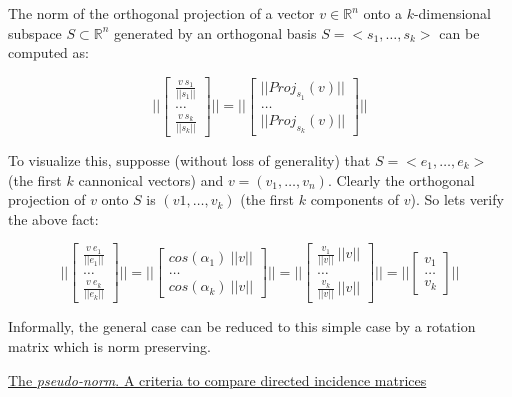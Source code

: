 \documentclass[a4paper,11pt]{article}
\begin{document}
\bigskip

The norm of the orthogonal projection of a vector $v \in \mathbb{R}^n$ 
onto a $k$-dimensional subspace $S \subset \mathbb{R}^n$ generated by an 
orthogonal basis $S = <s_1, \dots, s_k>$ can be computed as:

$$
||\begin{bmatrix}
	\frac{v \ s_1}{||s_1||} \\
	\dots \\
	\frac{v \ s_k}{||s_k||}
\end{bmatrix}|| = 
||\begin{bmatrix}
	||Proj_{s_1}(v)|| \\
	\dots \\
	||Proj_{s_k}(v)||
\end{bmatrix}||
$$

\bigskip

To visualize this, supposse (without loss of generality) that $S = 
<e_1, \dots, e_k>$ (the first $k$ cannonical vectors) and $v = (v_1, 
\dots, v_n)$. Clearly the orthogonal projection of $v$ onto $S$ 
is $(v1, \dots, v_k)$ (the first $k$ components of $v$). So lets verify 
the above fact:

$$
||\begin{bmatrix}
	\frac{v \ e_1}{||e_1||} \\
	\dots \\
	\frac{v \ e_k}{||e_k||}
\end{bmatrix}|| = 
||\begin{bmatrix}
	cos(\alpha_1) \ ||v|| \\
	\dots \\
	cos(\alpha_k) \ ||v||
\end{bmatrix}|| = 
||\begin{bmatrix}
	\frac{v_1}{||v||} \ ||v|| \\
	\dots \\
	\frac{v_k}{||v||} \ ||v||
\end{bmatrix}|| = 
||\begin{bmatrix}
	v_1 \\
	\dots \\
	v_k
\end{bmatrix}||
$$

\bigskip

Informally, the general case can be reduced to this simple case by a 
rotation matrix which is norm preserving.

\bigskip

\underline{The \textit{pseudo-norm}. A criteria to compare directed incidence matrices}
\end{document}
